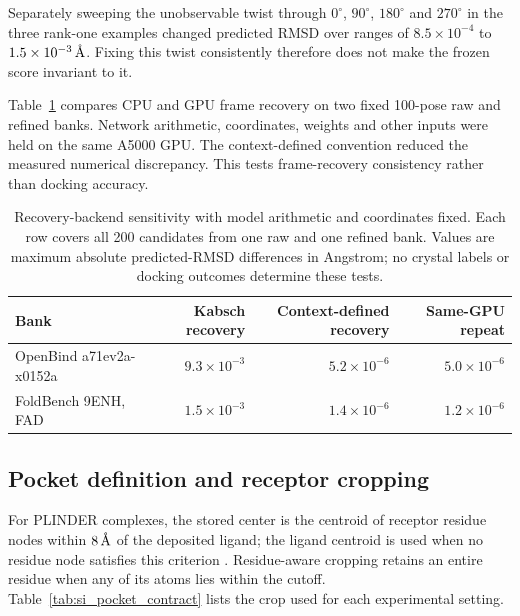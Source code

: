 \documentclass{article}
\newcommand{\angstrom}{\text{\normalfont\AA}}
\newcommand{\citep}[1]{\cite{#1}}
\begin{document}
Separately sweeping the unobservable twist through $0^\circ$, $90^\circ$, $180^\circ$ and $270^\circ$ in the three rank-one examples changed predicted RMSD over ranges of $8.5\times10^{-4}$ to $1.5\times10^{-3}\,\angstrom$. Fixing this twist consistently therefore does not make the frozen score invariant to it.

Table~\ref{tab:si_frame_backend} compares CPU and GPU frame recovery on two fixed 100-pose raw and refined banks. Network arithmetic, coordinates, weights and other inputs were held on the same A5000 GPU. The context-defined convention reduced the measured numerical discrepancy. This tests frame-recovery consistency rather than docking accuracy.

\begin{table}[htbp]
    \centering
    \small
    \caption{Recovery-backend sensitivity with model arithmetic and coordinates fixed. Each row covers all 200 candidates from one raw and one refined bank. Values are maximum absolute predicted-RMSD differences in Angstrom; no crystal labels or docking outcomes determine these tests.}
    \label{tab:si_frame_backend}
    \begin{tabular}{lrrr}
        \toprule
        Bank & Kabsch recovery & Context-defined recovery & Same-GPU repeat \\
        \midrule
        OpenBind a71ev2a-x0152a & $9.3\times10^{-3}$ & $5.2\times10^{-6}$ & $5.0\times10^{-6}$ \\
        FoldBench 9ENH, FAD & $1.5\times10^{-3}$ & $1.4\times10^{-6}$ & $1.2\times10^{-6}$ \\
        \bottomrule
    \end{tabular}
\end{table}

\subsection{Pocket definition and receptor cropping}

For PLINDER complexes, the stored center is the centroid of receptor residue nodes within $8\,\angstrom$ of the deposited ligand; the ligand centroid is used when no residue node satisfies this criterion \citep{durairaj2024plinder}.
Residue-aware cropping retains an entire residue when any of its atoms lies within the cutoff.
Table~\ref{tab:si_pocket_contract} lists the crop used for each experimental setting.
\end{document}
